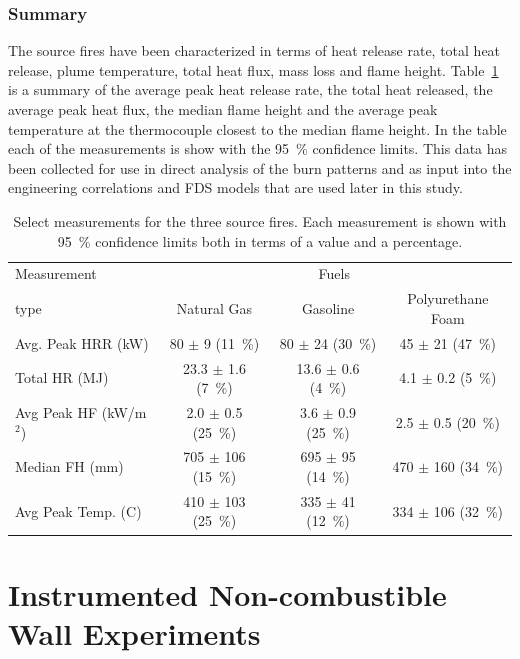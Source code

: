 \documentclass[twoside]{uocthesis}
\begin{document}
{\subsection{Summary}

The source fires have been characterized in terms of heat release rate, total heat release, plume temperature, total heat flux, mass loss and flame height.  Table~\ref{tab:Source_fire_summary} is a summary of the average peak heat release rate, the total heat released, the average peak heat flux, the median flame height and the average peak temperature at the thermocouple closest to the median flame height. In the table each of the measurements is show with the 95~\% confidence limits.  This data has been collected for use in direct analysis of the burn patterns and as input into the engineering correlations and FDS models that are used later in this study.

\begin{table}
\small
\centering
\begin{tabular}{|l|c|c|c|}
\hline
Measurement     &   \multicolumn{3}{|c|}{Fuels} \\ \cline{2-4}
type                    &       Natural Gas	            &   Gasoline	            & Polyurethane Foam \\ \hline \hline
Avg. Peak HRR (kW)      &       80 $\pm$ 9 (11~\%)   &	80 $\pm$ 24 (30~\%) 	& 45 $\pm$ 21 (47~\%)   \\
Total HR (MJ)           &   	23.3 $\pm$ 1.6 (7~\%)   &	13.6 $\pm$ 0.6 (4~\%) 	& 4.1 $\pm$ 0.2 (5~\%)   \\
Avg Peak HF (kW/m$^2$)   &   	2.0 $\pm$ 0.5 (25~\%)   &	3.6 $\pm$ 0.9 (25~\%) 	& 2.5 $\pm$ 0.5 (20~\%)   \\
Median FH (mm)           &   	705 $\pm$ 106 (15~\%)   &	695 $\pm$ 95 (14~\%) 	& 470 $\pm$ 160 (34~\%)   \\
Avg Peak Temp. (C)      &   	410 $\pm$ 103 (25~\%)   &	335 $\pm$ 41 (12~\%) 	& 334 $\pm$ 106 (32~\%)   \\
\hline
\end{tabular}
 \caption[Select measurements for the three source fires]{Select measurements for the three source fires. Each measurement is shown with 95~\% confidence limits both in terms of a value and a percentage.}
 \label{tab:Source_fire_summary}
\end{table}



\chapter{Instrumented Non-combustible Wall Experiments}

}
\end{document}
